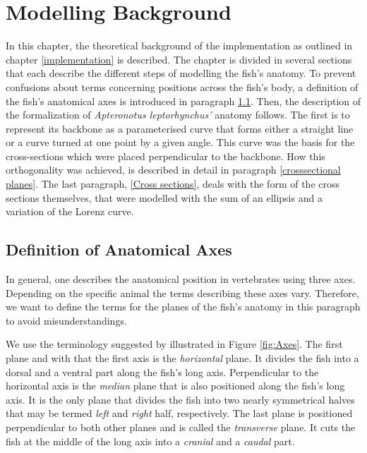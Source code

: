 
\chapter{Modelling Background} 
    \label{Modelling background}
    
In this chapter, the theoretical background of the implementation as outlined in chapter \ref{implementation} is described. The chapter is divided in several sections that each describe the different steps of modelling the fish's anatomy. To prevent confusions about terms concerning positions across the fish's body, a definition of the fish's anatomical axes is introduced in paragraph \ref{axes}. Then, the description of the formalization of \textit{Apteronotus leptorhynchus'} anatomy follows. The first is to represent its backbone as a parameterised curve that forms either a straight line or a curve turned at one point by a given angle. This curve was the basis for the cross-sections which were placed perpendicular to the backbone. How this orthogonality was achieved, is described in detail in paragraph \ref{crosssectional planes}. The last paragraph, \ref{Cross sections}, deals with the form of the cross sections themselves, that were modelled with the sum of an ellipsis and a variation of the Lorenz curve.

\section{Definition of Anatomical Axes}
    \label{axes}
    
In general, one describes the anatomical position in vertebrates using three axes. Depending on the specific animal the terms describing these axes vary. Therefore, we want to define the terms for the planes of the fish's anatomy in this paragraph to avoid misunderstandings. 

We use the terminology suggested by  illustrated in Figure \ref{fig:Axes}. The first plane and with that the first axis is the \textit{horizontal} plane. It divides the fish into a dorsal and a ventral part along the fish's long axis. Perpendicular to the horizontal axis is the \textit{median} plane that is also positioned along the fish's long axis. It is the only plane that divides the fish into two nearly symmetrical halves that may be termed \textit{left} and \textit{right} half, respectively. The last plane is positioned perpendicular to both other planes and is called the \textit{transverse} plane. It cuts the fish at the middle of the long axis into a \textit{cranial} and a \textit{caudal} part. \\

